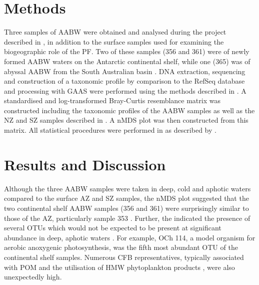 \section{Methods}




Three samples of \ac{AABW} were obtained and analysed during the project described in  , in addition to the surface samples used for examining the biogeographic role of the \ac{PF}.
Two of these samples (356 and 361) were of newly formed \ac{AABW} waters on the Antarctic continental shelf, while one (365) was of abyssal \ac{AABW} from the South Australian basin .
DNA extraction, sequencing and construction of a taxonomic profile by  comparison to the RefSeq database and processing with \ac{GAAS} were performed using the methods described in .
A standardised and log-transformed Bray-Curtis resemblance matrix was constructed including the taxonomic profiles of the \ac{AABW} samples as well as the \ac{NZ} and \ac{SZ} samples described in .
A \ac{nMDS} plot was then constructed from this matrix.
All statistical procedures were performed in  as described by \citet{Clarke:2001ut}.

\section{Results and Discussion}

Although the three \ac{AABW} samples were taken in deep, cold and aphotic waters  compared to the surface \ac{AZ} and \ac{SZ} samples, the \ac{nMDS} plot suggested that the two continental shelf \ac{AABW} samples (356 and 361) were surprisingly similar to those of the \ac{AZ}, particularly sample 353 .
Further, the indicated the presence of several \acp{OTU} which would not be expected to be present at significant abundance in deep, aphotic waters .
For example,  OCh 114, a model organism for aerobic anoxygenic photosynthesis, was the fifth most abundant \ac{OTU} of the continental shelf samples.
Numerous \ac{CFB} representatives, typically associated with \ac{POM} and the utilisation of \ac{HMW} phytoplankton products \citep[e.g.][]{Williams:2012gsa}, were also unexpectedly high.

